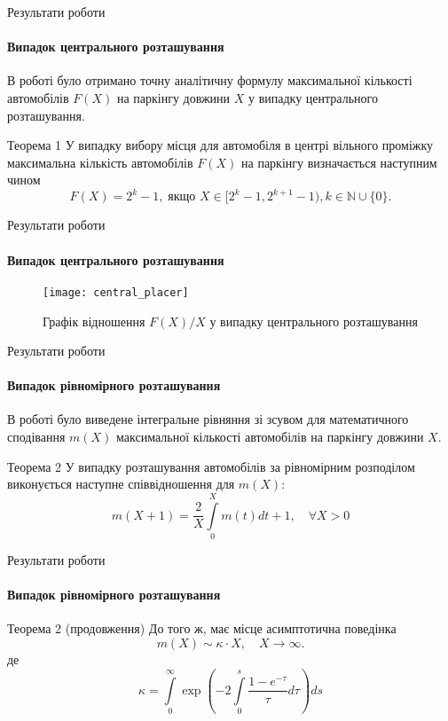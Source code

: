 \begin{frame}{Результати роботи}
	\framesubtitle{Випадок центрального розташування}
	В роботі було отримано точну аналітичну формулу максимальної кількості автомобілів $F(X)$ на паркінгу довжини $X$ у випадку центрального розташування.
	\begin{block}{Теорема 1}
		У випадку вибору місця для автомобіля в центрі вільного проміжку максимальна кількість автомобілів $F(X)$ на паркінгу визначається наступним чином
		\[
			F(X) = 2^k - 1,\; \text{якщо } X \in [2^k - 1, 2^{k+1} - 1), k \in \mathbb{N} \cup \{0\}.
		\]
	\end{block}
\end{frame}

\begin{frame}{Результати роботи}
	\framesubtitle{Випадок центрального розташування}
	\vspace{-10pt}
	\begin{figure}
		\centering
		\texttt{[image: central\_placer]}
		\caption{\centering Графік відношення $F(X)/X$ у випадку центрального розташування}
	\end{figure}

	
\end{frame}
\begin{frame}{Результати роботи}
	\framesubtitle{Випадок рівномірного розташування}
	В роботі було виведене інтегральне рівняння зі зсувом для математичного сподівання $m(X)$ максимальної кількості автомобілів на паркінгу довжини $X$.
	\begin{block}{Теорема 2}
	У випадку розташування автомобілів за рівномірним розподілом виконується наступне співвідношення для $m(X)$:
        \[
            	m(X + 1) = \frac{2}{X} \int\limits_0^{X} m(t) dt + 1,\quad \forall X > 0
        \]
	\end{block}
\end{frame}

\begin{frame}{Результати роботи}
	\framesubtitle{Випадок рівномірного розташування}
	\begin{block}{Теорема 2 (продовження)}
		До того ж, має місце асимптотична поведінка
		\[
	m(X) \sim  \kappa  \cdot X, \quad X \rightarrow \infty.
		\]
		де
		\[
			\kappa = \int\limits_0^\infty \exp\left( -2\int\limits_0^s \frac{1 - e^{-\tau}}{\tau} d\tau  \right) ds 
		\]
	\end{block}
\end{frame}

